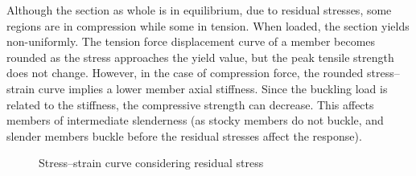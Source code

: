 \begin{itemize}
Although the section as whole is in equilibrium, due to residual stresses, some regions are in compression while some in tension. When loaded, the section yields non-uniformly. The tension force displacement curve of a member becomes rounded as the stress approaches the yield value, but the peak tensile strength does not change. However, in the case of compression force, the rounded stress--strain curve implies a lower member axial stiffness. Since the buckling load is related to the stiffness, the compressive strength can decrease. This affects members of intermediate slenderness (as stocky members do not buckle, and slender members buckle before the residual stresses affect the response).
\begin{figure}[H]
\centering
\caption{Stress--strain curve considering residual stress}
\end{figure}


\end{itemize}
